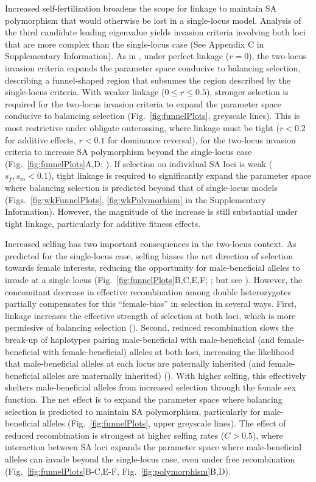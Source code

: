 \documentclass{article}
\begin{document}
Increased self-fertilization broadens the scope for linkage to maintain SA polymorphism that would otherwise be lost in a single-locus model. Analysis of the third candidate leading eigenvalue yields invasion criteria involving both loci that are more complex than the single-locus case (See Appendix C in Supplementary Information). As in \citet{Patten2010}, under perfect linkage ($r=0$), the two-locus invasion criteria expands the parameter space conducive to balancing selection, describing a funnel-shaped region that subsumes the region described by the single-locus criteria. With weaker linkage ($0 \leq r \leq 0.5$), stronger selection is required for the two-locus invasion criteria to expand the parameter space conducive to balancing selection (Fig.~\ref{fig:funnelPlots}, greyscale lines). This is most restrictive under obligate outcrossing, where linkage must be tight ($r < 0.2$ for additive effects, $r < 0.1$ for dominance reversal), for the two-locus invasion criteria to increase SA polymorphism beyond the single-locus case (Fig.~\ref{fig:funnelPlots}A,D; \citealt{Patten2010}). If selection on individual SA loci is weak ($s_f,s_m < 0.1$), tight linkage is required to significantly expand the parameter space where balancing selection is predicted beyond that of single-locus models (Figs.~\ref{fig:wkFunnelPlots}, \ref{fig:wkPolymorhism} in the Supplementary Information). However, the magnitude of the increase is still substantial under tight linkage, particularly for additive fitness effects.

Increased selfing has two important consequences in the two-locus context. As predicted for the single-locus case, selfing biases the net direction of selection towards female interests, reducing the opportunity for male-beneficial alleles to invade at a single locus (Fig.~\ref{fig:funnelPlots}B,C,E,F; \citealt{Charlesworth1978, JordanConn2014}; but see \citealt{Tazzyman2015}). However, the concomitant decrease in effective recombination among double heterozygotes partially compensates for this ``female-bias'' in selection in several ways. First, linkage increases the effective strength of selection at both loci, which is more permissive of balancing selection (\citealt{Patten2010}). Second, reduced recombination slows the break-up of haplotypes pairing male-beneficial with male-beneficial (and female-beneficial with female-beneficial) alleles at both loci, increasing the likelihood that male-beneficial alleles at each locus are paternally inherited (and female-beneficial alleles are maternally inherited) (\citealt{Patten2010, Ubeda2010}). With higher selfing, this effectively shelters male-beneficial alleles from increased selection through the female sex function. The net effect is to expand the parameter space where balancing selection is predicted to maintain SA polymorphism, particularly for male-beneficial alleles (Fig.~\ref{fig:funnelPlots}, upper greyscale lines). The effect of reduced recombination is strongest at higher selfing rates ($C > 0.5$), where interaction between SA loci expands the parameter space where male-beneficial alleles can invade beyond the single-locus case, even under free recombination (Fig.~\ref{fig:funnelPlots}B-C,E-F, Fig.~\ref{fig:polymorphism}B,D). 
\end{document}
